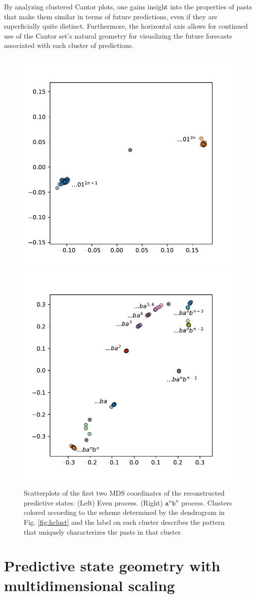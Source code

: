 \documentclass[sigconf, anonymous, review]{acmart}
\begin{document}
By analyzing clustered Cantor plots, one gains insight into the properties of
pasts that make them similar in terms of future predictions, even if they are
superficially quite distinct. Furthermore, the horizontal axis allows for
continued use of the Cantor set's natural geometry for visualizing the future
forecasts associated with each cluster of predictions.

\begin{figure}[ht]
\centering
\includegraphics[width=0.45\linewidth]{../plots/even_MDS.pdf}
\includegraphics[width=0.45\linewidth]{../plots/anbn_MDS.pdf}
\caption{Scatterplots of the first two MDS coordinates of the reconstructed
	predictive states: (Left) Even process. (Right) $\mathtt{a}^n\mathtt{b}^n$
	process. Clusters colored according to the scheme determined by the
	dendrogram in Fig. \ref{fig:hclust} and the label on each cluster describes
	the pattern that uniquely characterizes the pasts in that cluster.
	}
\label{fig:mds}
\end{figure}

\section{Predictive state geometry with multidimensional scaling}
\end{document}
